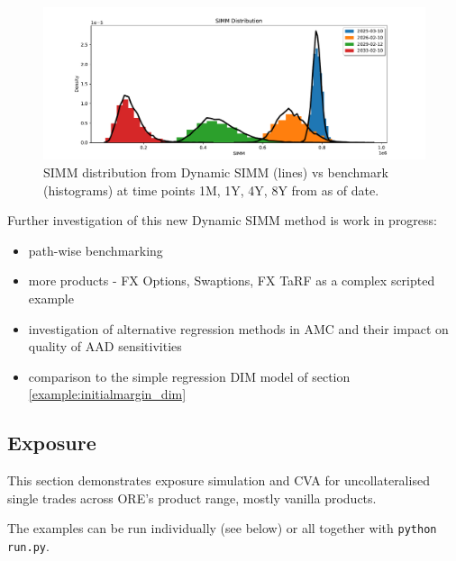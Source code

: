 \begin{figure}[h!]
\begin{center}
\includegraphics[scale=0.5]{examples/mpl_simm_distribution.pdf}
\end{center}
\caption{SIMM distribution from Dynamic SIMM (lines) vs benchmark (histograms) at time points 1M, 1Y, 4Y, 8Y from as of date.}
\label{fig_dim2_distributions}
\end{figure}

Further investigation of this new Dynamic SIMM method is work in progress:
\begin{itemize}
\item path-wise benchmarking
\item more products - FX Options, Swaptions, FX TaRF as a complex scripted example
\item investigation of alternative regression methods in AMC and their impact on quality of AAD sensitivities
\item comparison to the simple regression DIM model of section \ref{example:initialmargin_dim}
\end{itemize}

\subsection{Exposure}\label{example:exposure}

This section demonstrates exposure simulation and CVA for uncollateralised single trades across ORE's product range, mostly vanilla products.

The examples can be run individually (see below) or all together with {\tt python run.py}.

